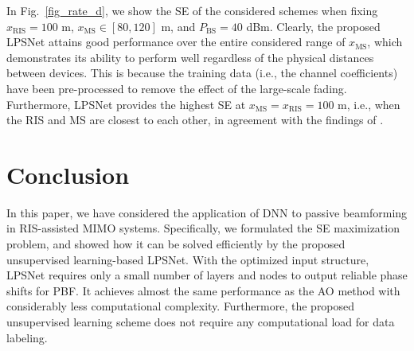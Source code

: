 \documentclass[conference]{IEEEtran}
\begin{document}
	In Fig.\ \ref{fig_rate_d}, we show the SE of the considered schemes when fixing $x_{\mathrm{RIS}} = 100$ m, $x_{\mathrm{MS}} \in [80,120]$ m, and $P_{\mathrm{BS}} = 40$ dBm. Clearly, the proposed LPSNet attains good performance over the entire considered range of $x_{\mathrm{MS}}$, which demonstrates its ability to perform well regardless of the physical distances between devices. This is because the training data (i.e., the channel coefficients) have been pre-processed to remove the effect of the large-scale fading. Furthermore, LPSNet provides the highest SE at $x_{\mathrm{MS}} = x_{\mathrm{RIS}} = 100$ m, i.e., when the RIS and MS are closest to each other, in agreement with the findings of \cite{wu2019intelligent, bjornson_intelligent_2019}.
	
	
	
	
	
	\section{Conclusion}
	\label{sec_concusion}
	In this paper, we have considered the application of DNN to passive beamforming in RIS-assisted MIMO systems. Specifically, we formulated the SE maximization problem, and showed how it can be solved efficiently by the proposed unsupervised learning-based LPSNet. With the optimized input structure, LPSNet requires only a small number of layers and nodes to output reliable phase shifts for PBF. It achieves almost the same performance as the AO method with considerably less computational complexity. Furthermore, the proposed unsupervised learning scheme does not require any computational load for data labeling.
	
	
	
	
	
	
	
	
\end{document}
